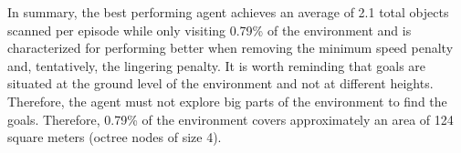           
        
        
        
        
        In summary, the best performing agent achieves an average of 2.1 total objects scanned per episode while only visiting 0.79\% of the environment and is characterized for performing better when removing the minimum speed penalty and, tentatively, the lingering penalty. It is worth reminding that goals are situated at the ground level of the environment and not at different heights. Therefore, the agent must not explore big parts of the environment to find the goals. Therefore, 0.79\% of the environment covers approximately an area of 124 square meters (octree nodes of size 4). 
    
